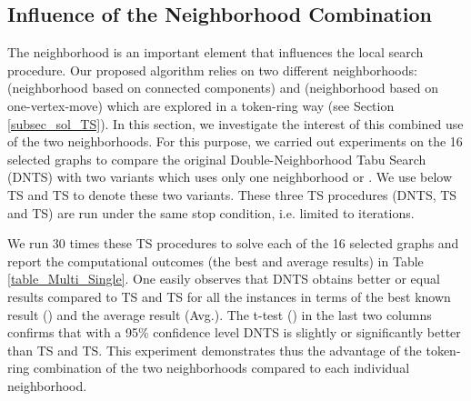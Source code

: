 \documentclass{elsart}
\begin{document}
\subsection{Influence of the Neighborhood Combination}
\label{subsec_sol_influence_neighborhood_combination}

The neighborhood is an important element that influences the local search procedure. Our proposed algorithm relies on two different neighborhoods:  (neighborhood based on connected components) and  (neighborhood based on one-vertex-move) which are explored in a token-ring way (see Section \ref{subsec_sol_TS}). In this section, we investigate the interest of this combined use of the two neighborhoods. For this purpose, we carried out experiments on the 16 selected graphs to compare the original Double-Neighborhood Tabu Search (DNTS) with two variants which uses only one neighborhood  or . We use below TS and TS to denote these two variants. These three TS procedures (DNTS, TS and TS) are run under the same stop condition, i.e. limited to  iterations.

We run 30 times these TS procedures to solve each of the 16 selected graphs and report the computational outcomes (the best and average results) in Table \ref{table_Multi_Single}. One easily observes that DNTS obtains better or equal results compared to TS and TS for all the instances in terms of the best known result () and the average result (Avg.). The t-test \emph{} () in the last two columns confirms that with a 95\% confidence level DNTS is slightly or significantly better than  TS and TS. This experiment demonstrates thus the advantage of the token-ring combination of the two neighborhoods compared to each individual neighborhood.
\end{document}
